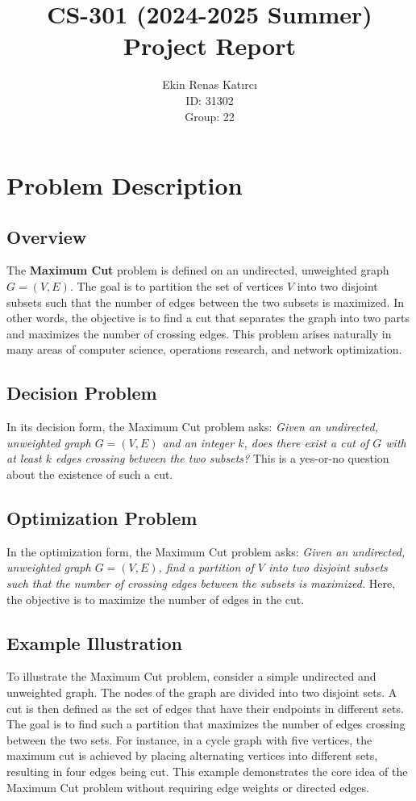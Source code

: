 \documentclass[12pt]{article}
\title{CS-301 (2024-2025 Summer) \\ Project Report}
\author{Ekin Renas Katırcı \\ ID: 31302 \\ Group: 22}
\date{}
\begin{document}
\maketitle

\section{Problem Description}

\subsection{Overview}
The \textbf{Maximum Cut} problem is defined on an undirected, unweighted graph $G = (V,E)$. The goal is to partition the set of vertices $V$ into two disjoint subsets such that the number of edges between the two subsets is maximized. In other words, the objective is to find a cut that separates the graph into two parts and maximizes the number of crossing edges. This problem arises naturally in many areas of computer science, operations research, and network optimization.

\subsection{Decision Problem}
In its decision form, the Maximum Cut problem asks:  
\textit{Given an undirected, unweighted graph $G = (V,E)$ and an integer $k$, does there exist a cut of $G$ with at least $k$ edges crossing between the two subsets?}  
This is a yes-or-no question about the existence of such a cut.

\subsection{Optimization Problem}
In the optimization form, the Maximum Cut problem asks:  
\textit{Given an undirected, unweighted graph $G = (V,E)$, find a partition of $V$ into two disjoint subsets such that the number of crossing edges between the subsets is maximized.}  
Here, the objective is to maximize the number of edges in the cut.


\subsection{Example Illustration}

To illustrate the Maximum Cut problem, consider a simple undirected and unweighted graph. 
The nodes of the graph are divided into two disjoint sets. 
A cut is then defined as the set of edges that have their endpoints in different sets. 
The goal is to find such a partition that maximizes the number of edges crossing between the two sets. 
For instance, in a cycle graph with five vertices, the maximum cut is achieved by placing alternating 
vertices into different sets, resulting in four edges being cut. 
This example demonstrates the core idea of the Maximum Cut problem without requiring edge weights 
or directed edges.
\end{document}
